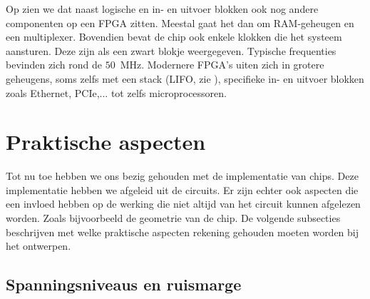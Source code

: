 Op  zien we dat naast logische en in- en uitvoer blokken ook nog andere componenten op een FPGA zitten. Meestal gaat het dan om RAM-geheugen en een multiplexer. Bovendien bevat de chip ook enkele klokken die het systeem aansturen. Deze zijn als een zwart blokje weergegeven. Typische frequenties bevinden zich rond de $50$~MHz. Modernere FPGA's uiten zich in grotere geheugens, soms zelfs met een stack (LIFO, zie ), specifieke in- en uitvoer blokken zoals Ethernet, PCIe,... tot zelfs microprocessoren.

\section{Praktische aspecten}
Tot nu toe hebben we ons bezig gehouden met de implementatie van chips. Deze implementatie hebben we afgeleid uit de circuits. Er zijn echter ook aspecten die een invloed hebben op de werking die niet altijd van het circuit kunnen afgelezen worden. Zoals bijvoorbeeld de geometrie van de chip. De volgende subsecties beschrijven met welke praktische aspecten rekening gehouden moeten worden bij het ontwerpen.

\subsection{Spanningsniveaus en ruismarge}
